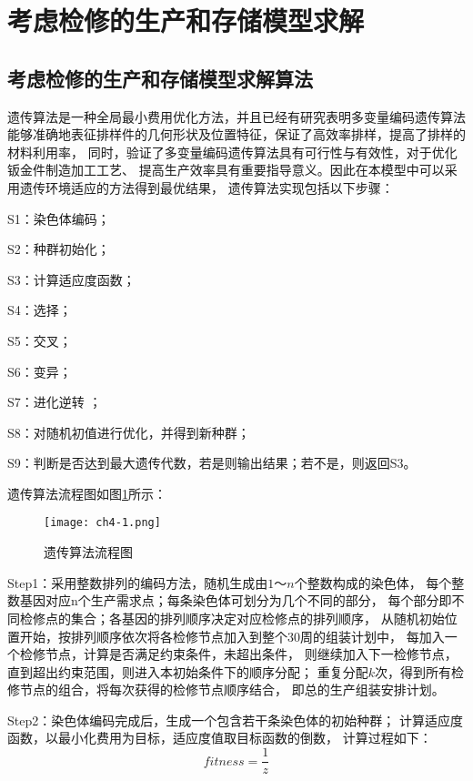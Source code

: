 \section{考虑检修的生产和存储模型求解}

\subsection{考虑检修的生产和存储模型求解算法}
遗传算法\cite{王小平2002遗传算法}是一种全局最小费用优化方法，并且已经有研究表明多变量编码遗传算法
\cite{张京京2022多变量编码遗传算法在管道类零件展开图排样中的应用,jiyugaijinyichuansuanfa}
能够准确地表征排样件的几何形状及位置特征，保证了高效率排样，提高了排样的材料利用率，
同时，验证了多变量编码遗传算法具有可行性与有效性，对于优化钣金件制造加工工艺、
提高生产效率具有重要指导意义。因此在本模型中可以采用遗传环境适应的方法得到最优结果，
遗传算法实现包括以下步骤：

S1：染色体编码；

S2：种群初始化；

S3：计算适应度函数；

S4：选择；

S5：交叉；

S6：变异；

S7：进化逆转 ；

S8：对随机初值进行优化，并得到新种群；

S9：判断是否达到最大遗传代数，若是则输出结果；若不是，则返回S3。

遗传算法流程图如图\ref{f.ch4-1}所示：

\begin{figure}[h]
    \centering
    \texttt{[image: ch4-1.png]}
    \caption{遗传算法流程图}
    \label{f.ch4-1}
\end{figure}

Step1：采用整数排列的编码方法，随机生成由$1～n$个整数构成的染色体，
每个整数基因对应n个生产需求点；每条染色体可划分为几个不同的部分，
每个部分即不同检修点的集合；各基因的排列顺序决定对应检修点的排列顺序，
从随机初始位置开始，按排列顺序依次将各检修节点加入到整个30周的组装计划中，
每加入一个检修节点，计算是否满足约束条件，未超出条件，
则继续加入下一检修节点，直到超出约束范围，则进入本初始条件下的顺序分配；
重复分配$k$次，得到所有检修节点的组合，将每次获得的检修节点顺序结合，
即总的生产组装安排计划\cite{包子阳2016智能优化算法}。

Step2：染色体编码完成后，生成一个包含若干条染色体的初始种群；
计算适应度函数，以最小化费用为目标，适应度值取目标函数的倒数，
计算过程如下：
\begin{equation}
    \label{eq_fitness}
    fitness=\frac{1}{z}
\end{equation}

